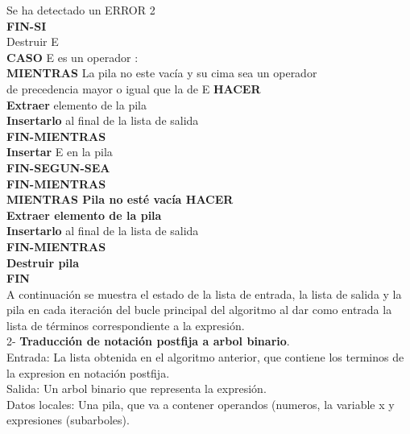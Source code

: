 \documentclass[12pt]{article}
\begin{document}
\begin{tabla}
             Se ha detectado un ERROR 2\\
	   \textbf{FIN-SI}\\
           Destruir E\\
	 \textbf{CASO} E es un operador :\\
	   \textbf{MIENTRAS} La pila no este vacía y su cima sea un operador\\
		    de precedencia mayor o igual que la de E \textbf{HACER}\\
	     \textbf{Extraer} elemento de la pila\\
	    \textbf{Insertarlo} al final de la lista de salida \\
	  \textbf{FIN-MIENTRAS}\\
	   \textbf{Insertar} E en la pila\\
      \textbf{FIN-SEGUN-SEA}\\
    \textbf{FIN-MIENTRAS}\\
   \textbf{MIENTRAS Pila no esté vacía HACER}\\
      \textbf{Extraer elemento de la pila}\\
      \textbf{Insertarlo} al final de la lista de salida\\
    \textbf{FIN-MIENTRAS}\\
   \textbf{Destruir pila}\\
 \textbf{FIN}
\\
A continuación se muestra el estado de la lista de entrada, la lista de salida y la pila en cada iteración del bucle principal del algoritmo al dar como entrada la lista de términos correspondiente a la expresión. \\

2- \textbf{Traducción de notación postfija a arbol binario}.\\

Entrada: La lista obtenida en el algoritmo anterior, que contiene los terminos de la expresion en notación postfija.\\
Salida: Un arbol binario que representa la expresión.\\
Datos locales: Una pila, que va a contener operandos (numeros, la variable x y expresiones (subarboles).\\ 


\end{tabla}
\end{document}
